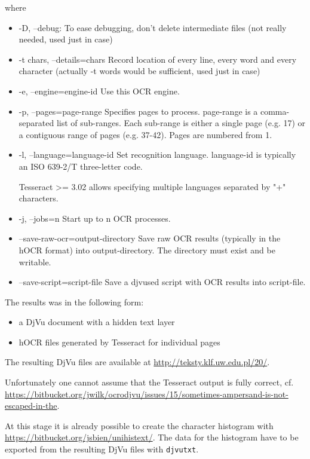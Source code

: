 \documentclass{article}
\begin{document}
where
\begin{itemize}
\item 	-D, --debug:
	    To ease debugging, don't delete intermediate files (not really needed, used just in case)
\item -t chars, --details=chars Record location of every
            line, every word and every character (actually -t words
            would be sufficient, used just in case)
\item 	-e, --engine=engine-id
	    Use this OCR engine.
\item 	-p, --pages=page-range
	    Specifies pages to process.  page-range is a
	    comma-separated list of sub-ranges. Each sub-range is
	    either a single page (e.g. 17) or a contiguous range of
	    pages (e.g. 37-42). Pages are numbered from 1.
\item 	-l, --language=language-id
	    Set recognition language.  language-id is typically an
	    ISO 639-2/T three-letter code.

	    Tesseract >= 3.02 allows specifying multiple languages
	    separated by "+" characters.
\item 	-j, --jobs=n
	    Start up to n OCR processes.
\item  	--save-raw-ocr=output-directory
	    Save raw OCR results (typically in the hOCR format) into
	    output-directory. The directory must exist and be
	    writable.
\item 	--save-script=script-file
	    Save a djvused script with OCR results into script-file.
\end{itemize}

The results was in the following form:
\begin{itemize}
\item a DjVu document with a hidden text layer
\item hOCR files generated by Tesseract for individual pages
\end{itemize}

The resulting DjVu files are available at \url{http://teksty.klf.uw.edu.pl/20/}.


Unfortunately one cannot assume that the Tesseract output is fully
correct,
cf. \url{https://bitbucket.org/jwilk/ocrodjvu/issues/15/sometimes-ampersand-is-not-escaped-in-the}.

At this stage it is already possible to create the character histogram
with \url{https://bitbucket.org/jsbien/unihistext/}. The data for the
histogram have to be exported from the resulting DjVu files with
\texttt{djvutxt}.
\end{document}
